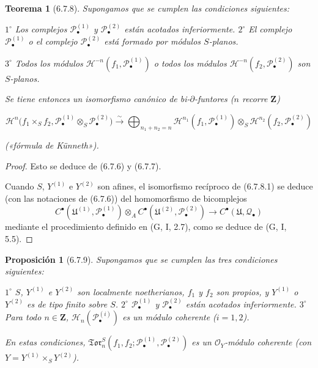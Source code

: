 \documentclass[10pt,oneside,openany]{book}
\theoremstyle{egaenv}\newtheorem*{env}{---}
\theoremstyle{egastatement}
\newtheorem*{theorem}{Teorema}
\newtheorem*{proposition}{Proposición}
\theoremstyle{egadescription}
\newcommand{\oldpage}[2][]{\marginnote{\normalfont\scriptsize\textbf{#1}\,|\,#2}\ignorespaces}
\begin{document}
\begin{theorem}[6.7.8]
\label{III.6.7.8}
Supongamos que se cumplen las condiciones siguientes:

  $1^\circ$
    Los complejos $\mathscr P_\bullet^{(1)}$ y
    $\mathscr P_\bullet^{(2)}$ están acotados inferiormente.
  $2^\circ$
    El complejo $\mathscr P_\bullet^{(1)}$ \textup{o} el complejo
    $\mathscr P_\bullet^{(2)}$ está formado por módulos $S$-planos.

  $3^\circ$
    \oldpage[III]{162}
    Todos los módulos $\mathscr H^{-n}(f_1,\mathscr P_\bullet^{(1)})$ \textup{o} todos
    los módulos $\mathscr H^{-n}(f_2,\mathscr P_\bullet^{(2)})$ son
    $S$-planos.

Se tiene entonces un isomorfismo canónico de bi-$\partial$-funtores
($n$ recorre $\mathbf Z$)

\label{III.6.7.8.1}
\[
  \mathscr H^n\bigl(f_1\times_S f_2,
    \mathscr P_\bullet^{(1)}\otimes_S\mathscr P_\bullet^{(2)}\bigr)
  \xrightarrow{\sim}
  \bigoplus_{n_1+n_2=n}
  \mathscr H^{n_1}(f_1,\mathscr P_\bullet^{(1)})
  \otimes_S
  \mathscr H^{n_2}(f_2,\mathscr P_\bullet^{(2)})
  \tag{6.7.8.1}\label{III.6.7.8.1.fr}
\]

(«fórmula de Künneth»).
\end{theorem}

\begin{proof}
Esto se deduce de (6.7.6) y (6.7.7).

Cuando $S$, $Y^{(1)}$ e $Y^{(2)}$ son afines, el isomorfismo recíproco de
(6.7.8.1) se deduce (con las notaciones de (6.7.6)) del homomorfismo de
bicomplejos
\[
  C^\bullet(\mathfrak U^{(1)},\mathscr P_\bullet^{(1)})
  \otimes_A
  C^\bullet(\mathfrak U^{(2)},\mathscr P_\bullet^{(2)})
  \longrightarrow
  C^\bullet(\mathfrak U,\mathscr Q_\bullet)
\]
mediante el procedimiento definido en (G, I, 2.7), como se deduce de
(G, I, 5.5).
\end{proof}

\begin{proposition}[6.7.9]
\label{III.6.7.9}
Supongamos que se cumplen las tres condiciones siguientes:

  $1^\circ$
    $S$, $Y^{(1)}$ e $Y^{(2)}$ son localmente noetherianos, $f_1$ y $f_2$
    son propios, y $Y^{(1)}$ o $Y^{(2)}$ es de tipo finito sobre $S$.
  $2^\circ$
    $\mathscr P_\bullet^{(1)}$ y $\mathscr P_\bullet^{(2)}$ están acotados
    inferiormente.
  $3^\circ$
    Para todo $n\in\mathbf Z$,
    $\mathscr H_n(\mathscr P_\bullet^{(i)})$ es un módulo coherente
    ($i=1,2$).

En estas condiciones,
$\mathfrak{Tor}_n^S
(f_1,f_2;\mathscr P_\bullet^{(1)},\mathscr P_\bullet^{(2)})$ es un
$\mathscr O_Y$-módulo coherente (con
$Y=Y^{(1)}\times_S Y^{(2)}$).
\end{proposition}
\end{document}
